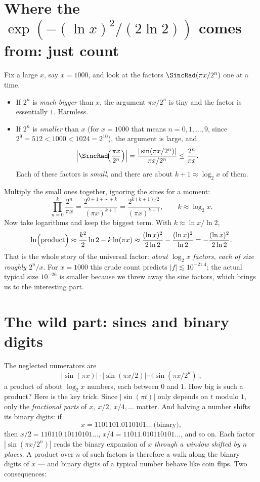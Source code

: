 \documentclass[11pt,oneside]{article}
\theoremstyle{remark}
\begin{document}
\section{Where the \texorpdfstring{$\exp(-(\ln x)^2/(2\ln2))$}{exp(-ln²x/2ln2)} comes from: just count}

Fix a large $x$, say $x=1000$, and look at the factors
$\SincRad(\pi x/2^n)$ one at a time.

\begin{itemize}
\item If $2^n$ is \emph{much bigger} than $x$, the argument
$\pi x/2^n$ is tiny and the factor is essentially $1$.  Harmless.
\item If $2^n$ is \emph{smaller} than $x$ (for $x=1000$ that means
$n=0,1,\dots,9$, since $2^9=512<1000<1024=2^{10}$), the argument is
large, and
\[
 \Bigl|\SincRad\!\Bigl(\frac{\pi x}{2^n}\Bigr)\Bigr|
 =\frac{|\sin(\pi x/2^n)|}{\pi x/2^n}
 \le\frac{2^n}{\pi x}.
\]
Each of these factors is \emph{small}, and there are about
$k+1\approx\log_2x$ of them.
\end{itemize}
Multiply the small ones together, ignoring the sines for a moment:
\[
 \prod_{n=0}^{k}\frac{2^n}{\pi x}
 =\frac{2^{0+1+\cdots+k}}{(\pi x)^{k+1}}
 =\frac{2^{k(k+1)/2}}{(\pi x)^{k+1}},
 \qquad k\approx\log_2 x .
\]
Now take logarithms and keep the biggest term.  With
$k\approx\ln x/\ln2$,
\[
 \ln\Bigl(\text{product}\Bigr)
 \approx\frac{k^2}{2}\ln 2-k\ln(\pi x)
 \approx\frac{(\ln x)^2}{2\ln2}-\frac{(\ln x)^2}{\ln 2}
 =-\frac{(\ln x)^2}{2\ln 2}.
\]
That is the whole story of the universal factor: \emph{about
$\log_2x$ factors, each of size roughly $2^n/x$}.  For $x=1000$ this
crude count predicts $|f|\lesssim10^{-21.4}$; the actual typical size
$10^{-26}$ is smaller because we threw away the sine factors, which
brings us to the interesting part.

\section{The wild part: sines and binary digits}

The neglected numerators are
\[
 \bigl|\sin(\pi x)\bigr|\cdot
 \bigl|\sin(\pi x/2)\bigr|\cdots
 \bigl|\sin(\pi x/2^k)\bigr| ,
\]
a product of about $\log_2x$ numbers, each between $0$ and $1$.  How
big is such a product?  Here is the key trick.  Since
$|\sin(\pi t)|$ only depends on $t$ modulo $1$, only the
\emph{fractional parts} of $x,\ x/2,\ x/4,\dots$ matter.  And halving
a number shifts its binary digits: if
\[
 x=1101101.0110101\ldots\ \text{(binary)},
\]
then $x/2=110110.10110101\ldots$, $x/4=11011.010110101\ldots$, and so
on.  Each factor $|\sin(\pi x/2^n)|$ reads the binary expansion of $x$
\emph{through a window shifted by $n$ places}.  A product over $n$ of
such factors is therefore a walk along the binary digits of $x$ ---
and binary digits of a typical number behave like coin flips.  Two
consequences:
\end{document}
